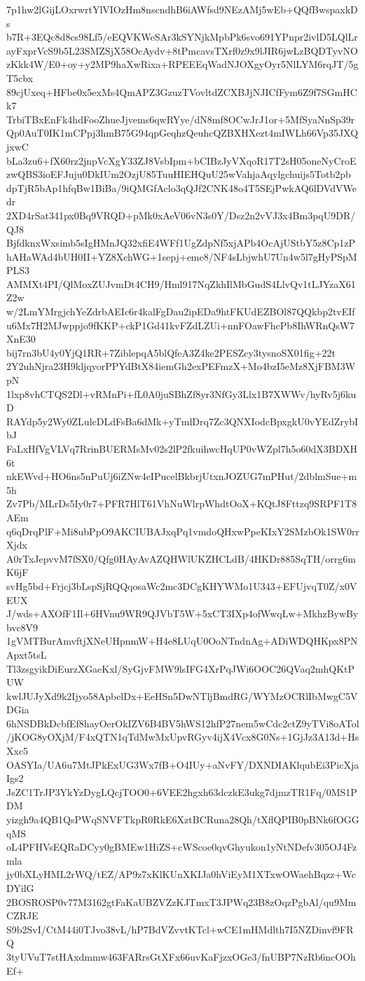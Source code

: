 7p1hw2lGijLOxrwrtYlVIOzHm8nscndhB6iAWfsd9NEzAMj5wEb+QQfBwspaxkDs
b7R+3EQc8d8cs98Lf5/eEQVKWeSAr3kSYNjkMpbPk6svo691YPnpr2ivlD5LQlLr
ayFxprVcS9b5L23SMZSjX58OcAydv+8tPmcavsTXrf0z9x9lJIR6jwLzBQDTyvNO
zKkk4W/E0+oy+y2MP9haXwRixa+RPEEEqWadNJOXgyOyr5NlLYM6rqJT/5gT5cbx
89cjUxeq+HFbe0x5exMs4QmAPZ3GzuzTVovltdZCXBJjNJICfFym6Z9f7SGmHCk7
TrbiTBxEnFk4hdFooZhueJjvems6qwRYye/dN8mf8OCwJrJ1or+5MfSyaNnSp39r
Qp0AuT0IK1mCPpj3hmB75G94qpGeqhzQeuhcQZBXHXezt4mIWLh66Vp35JXQjxwC
bLa3zu6+fX60rz2jnpVcXgY33ZJ8VsbIpm+bCIBzJyVXqoR17T2sH05oneNyCroE
zwQBS3ioEFJuju0DkIUm2OzjU85TuuHIEHQuU25wVahjaAqylgchuijs5Totb2pb
dpTjR5bAp1hfqBw1BiBa/9iQMGfAclo3qQJf2CNK48o4T5SEjPwkAQ6lDVdVWedr
2XD4rSat341px0Bq9VRQD+pMk0xAeV06vN3s0Y/Dsz2n2vVJ3x4Bm3pqU9DR/QJ8
BjfdknxWxsimb5sIgHMnJQ32xfiE4WFf1UgZdpNf5xjAPb4OcAjUStbY5z8Cp1zP
hAHaWAd4bUH0II+YZ8XchWG+1sepj+eme8/NF4sLbjwhU7Un4w5l7gHyPSpMPLS3
AMMXt4PI/QlMoxZUJvmDt4CH9/Hml917NqZkhIlMbGudS4LlvQv1tLJYzaX61Z2w
w/2LmYMrgjchYeZdrbAEIc6r4kalFgDau2ipEDa9htFKUdEZBOl87QQkbp2tvEIf
u6Mx7H2MJwppjo9fKKP+ckP1Gd41kvFZdLZUi+nnFOawFhcPb8IhWRnQsW7XnE30
bij7rn3bU4y0YjQ1RR+7ZiblepqA5blQfeA3Z4ke2PESZcy3tysnoSX01fig+22t
2Y2uhNjra23H9kljqyorPPYdBtX84iemGh2exPEFmzX+Mo4bzI5eMz8XjFBM3WpN
1lxp8vhCTQS2Dl+vRMnPi+fL0A0juSBhZf8yr3NfGy3Llx1B7XWWv/hyRv5j6kuD
RAYdp5y2Wy0ZLulcDLdFsBa6dMk+yTmlDrq7Zc3QNXIodcBpxgkU0vYEdZrybIbJ
FaLxHfVgVLVq7RrinBUERMsMv02s2lP2fkuihwcHqUP0vWZpl7h5o60dX3BDXH6t
nkEWvd+HO6ns5nPuUj6iZNw4eIPucelBkbrjUtxnJOZUG7mPHut/2dblmSue+m5h
Zv7Pb/MLrDs5Iy0r7+PFR7HlT61VhNuWlrpWhdtOoX+KQtJ8Fttzq9SRPF1T8AEm
q6qDrqPlF+Mi8ubPpO9AKCIUBAJxqPq1vmdoQHxwPpeKIxY2SMzbOk1SW0rrXjdx
A0rTxJepvvM7fSX0/Qfg0HAyAvAZQHWlUKZHCLdB/4HKDr885SqTH/orrg6mK6jF
svHg5bd+Frjcj3bLspSjRQQqosaWc2mc3DCgKHYWMo1U343+EFUjvqT0Z/x0VEUX
J/wds+AXOfF1Il+6HVnu9WR9QJVbT5W+5xCT3IXp4ofWwqLw+MkhzBywBybvc8V9
1gVMTBurAmvftjXNeUHpnmW+H4e8LUqU0OoNTndnAg+ADiWDQHKpx8PNApxt5tsL
Tl3zsgyikDiEurzXGaeKxl/SyGjvFMW9lsIFG4XrPqJWi6OOC26QVaq2mhQKtPUW
kwlJUJyXd9k2Ijyo58ApbelDx+EeHSn5DwNTljBmdRG/WYMzOCRlIbMwgC5VDGia
6hNSDBkDcbfEf8hayOerOkIZV6B4BV5hWS12hfP27nem5wCdc2ctZ9yTVi8oATol
/jKOG8yOXjM/F4xQTN1qTdMwMxUpvRGyv4ijX4Vcx8G0Ns+1GjJz3A13d+HsXxc5
OASYIa/UA6u7MtJPkExUG3Wx7fB+O4IUy+aNvFY/DXNDIAKlqubEi3PicXjaIgs2
JsZC1TrJP3YkYzDygLQcjTOO0+6VEE2hgxh63dczkE3ukg7djmzTR1Fq/0MS1PDM
yizgh9a4QB1QsPWqSNVFTkpR0RkE6XztBCRuna28Qh/tXflQPIB0pBNk6fOGGqMS
oL4PFHVsEQRaDCyy0gBMEw1HiZS+cWScoe0qvGhyukon1yNtNDefv305OJ4Fzmla
jy0bXLyHML2rWQ/tEZ/AP9z7xKlKUnXKIJa0hViEyM1XTxwOWaehBqzz+WcDYilG
2BOSROSP0v77M3162gtFaKaUBZVZzKJTmxT3JPWq23B8zOqzPgbAl/qu9MmCZRJE
S9b2SvI/CtM44i0TJvo38vL/hP7BdVZvvtKTcl+wCE1mHMdlth7I5NZDinvf9FRQ
3tyUVuT7stHAxdmmw463FARrsGtXFx66uvKaFjzxOGe3/fnUBP7NzRb6ncOOhEf+
